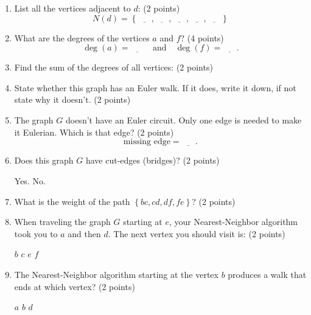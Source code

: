 \documentclass[12pt]{exam}
\begin{document}
\begin{enumerate}
\begin{enumerate}
\begin{figure}[h!]
\begin{tikzpicture}[x=0.75pt,y=0.75pt,yscale=-1,xscale=1]
    
    \end{tikzpicture}
\end{figure}
\vfill
\item List all the vertices adjacent to $d$: (2 points)
$$N(d)=\left\lbrace\underline{\phantom{ans}},\underline{\phantom{ans}},\underline{\phantom{ans}},\underline{\phantom{ans}},\underline{\phantom{ans}}\right\rbrace$$

\vfill
\item What are the degrees of the vertices $a$ and $f$? (4 points)
$$\deg(a)=\underline{\phantom{ans}}\quad\text{and}\quad\deg(f)=\underline{\phantom{ans}}.$$
\vfill
\item Find the sum of the degrees of all vertices: (2 points)
\begin{checkboxes}
\end{checkboxes}
\vfill
\item State whether this graph has an Euler walk. If it does, write it down, if not state why it doesn't. (2 points)
    \vspace{7em}
\vfill
\item The graph $G$ doesn't have an Euler circuit. Only one edge is needed to make it Eulerian. Which is that edge? (2 points)
  $$\text{missing edge}=\underline{\phantom{ans}}.$$
\vfill
\item Does this graph $G$ have cut-edges (bridges)? (2 points)
    \begin{checkboxes}
        \choice Yes.
        \choice No.
    \end{checkboxes}
    \vfill
\item What is the weight of the path $\left\lbrace bc,cd,df,fe\right\rbrace$? (2 points)
\begin{checkboxes}
\end{checkboxes}
\vfill
\item When traveling the graph $G$ starting at $e$, your Nearest-Neighbor algorithm took you to $a$ and then $d$. The next vertex you should visit is: (2 points)
\begin{checkboxes}
    \choice $b$
    \choice $c$
    \choice $e$
    \choice $f$
\end{checkboxes}
\vfill
\item The Nearest-Neighbor algorithm starting at the vertex $b$ produces a walk that ends at which vertex? (2 points)
\begin{checkboxes}
    \choice $a$
    \choice $b$
    \choice $d$

\end{checkboxes}
\end{enumerate}
\end{enumerate}
\end{document}
